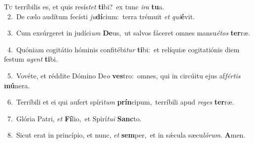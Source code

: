 \lettrine{\initial\textcolor{\initialcolor}{T}}{u} terríbilis es, et quis resís\textit{tet} \textbf{ti}\-bi?~\star ex tunc \textit{i}\-\textit{ra} \textbf{tu}\-a.\\
{\numbfont\textcolor{\numbcolor}{~2.}}~De cælo audítum fecísti \textit{ju}\-\textbf{dí}cium:~\star terra trémuit \textit{et} \textit{qui}\-\textbf{é}vit.\par
{\numbfont\textcolor{\numbcolor}{~3.}}~Cum exsúrgeret in judíci\textit{um} \textbf{De}\-us,~\star ut salvos fáceret omnes mansu\-\textit{é}\-\textit{tos} \textbf{ter}\-ræ.\par
{\numbfont\textcolor{\numbcolor}{~4.}}~Quóniam cogitátio hóminis confitébi\textit{tur} \textbf{ti}\-bi:~\star et relíquiæ cogitatiónis diem festum \textit{a}\-\textit{gent} \textbf{ti}\-bi.\par
{\numbfont\textcolor{\numbcolor}{~5.}}~Vovéte, et réddite Dómino De\textit{o} \textbf{ves}\-tro:~\star omnes, qui in circúitu ejus af\-\textit{fér}\-\textit{tis} \textbf{mú}\-nera.\par
{\numbfont\textcolor{\numbcolor}{~6.}}~Terríbili et ei qui aufert spíri\textit{tum} \textbf{prín}\-cipum,~\star terríbili apud \textit{re}\-\textit{ges} \textbf{ter}\-ræ.\par
{\numbfont\textcolor{\numbcolor}{~7.}}~Glória Patri, \textit{et} \textbf{Fí}\-lio,~\star et Spirí\-\textit{tu}\-\textit{i} \textbf{Sanc}\-to.\par
{\numbfont\textcolor{\numbcolor}{~8.}}~Sicut erat in princípio, et nunc, \textit{et} \textbf{sem}\-per,~\star et in sǽcula sæcu\-\textit{ló}\-\textit{rum}. \textbf{A}\-men.\par
